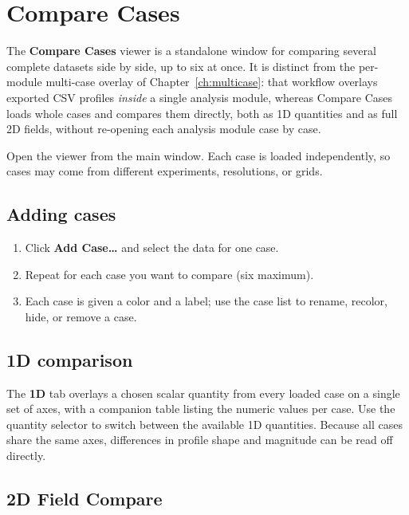 \documentclass[11pt, a4paper]{report}
\newcommand{\uipth}[1]{\textbf{\textcolor{upblue}{#1}}}
\begin{document}
\chapter{Compare Cases}
\label{ch:comparecases}

The \uipth{Compare Cases} viewer is a standalone window for comparing several complete datasets side by side, up to six at once. It is distinct from the per-module multi-case overlay of Chapter~\ref{ch:multicase}: that workflow overlays exported CSV profiles \emph{inside} a single analysis module, whereas Compare Cases loads whole cases and compares them directly, both as 1D quantities and as full 2D fields, without re-opening each analysis module case by case.

Open the viewer from the main window. Each case is loaded independently, so cases may come from different experiments, resolutions, or grids.

\section{Adding cases}

\begin{stepbox}
\begin{enumerate}[leftmargin=1.5em, topsep=2pt]
  \item Click \uipth{Add Case\ldots} and select the data for one case.
  \item Repeat for each case you want to compare (six maximum).
  \item Each case is given a color and a label; use the case list to rename, recolor, hide, or remove a case.
\end{enumerate}
\end{stepbox}

\section{1D comparison}

The \uipth{1D} tab overlays a chosen scalar quantity from every loaded case on a single set of axes, with a companion table listing the numeric values per case. Use the quantity selector to switch between the available 1D quantities. Because all cases share the same axes, differences in profile shape and magnitude can be read off directly.

\section{2D Field Compare}
\end{document}
